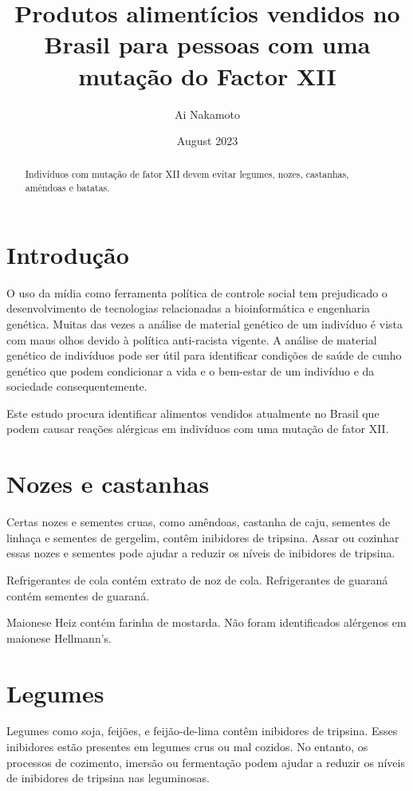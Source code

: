 \documentclass{article}
\begin{document}
\title{Produtos alimentícios vendidos no Brasil para pessoas com uma mutação do Factor XII}
\author{Ai Nakamoto}
\date{August 2023}
\maketitle

\begin{abstract}
Indivíduos com mutação de fator XII devem evitar
legumes, nozes, castanhas, amêndoas e batatas.
\end{abstract}

\section{Introdução}

O uso da mídia como ferramenta política de controle social
tem prejudicado o desenvolvimento de tecnologias relacionadas
a bioinformática e engenharia genética. Muitas das vezes
a análise de material genético de um indivíduo é vista com
maus olhos devido à política anti-racista vigente.
A análise de material genético de indivíduos pode ser útil
para identificar condições de saúde de cunho genético que
podem condicionar a vida e o bem-estar de um indivíduo e
da sociedade consequentemente.

Este estudo procura identificar alimentos vendidos atualmente
no Brasil que podem causar reações alérgicas em indivíduos com
uma mutação de fator XII.

\section{Nozes e castanhas}

Certas nozes e sementes cruas, como amêndoas, castanha de caju, sementes de linhaça e sementes de gergelim, contêm inibidores de tripsina. Assar ou cozinhar essas nozes e sementes pode ajudar a reduzir os níveis de inibidores de tripsina.

Refrigerantes de cola contém extrato de noz de cola.
Refrigerantes de guaraná contém sementes de guaraná.

Maionese Heiz contém farinha de mostarda.
Não foram identificados alérgenos em maionese Hellmann's.

\section{Legumes}

Legumes como soja, feijões, e feijão-de-lima contêm inibidores de tripsina.
Esses inibidores estão presentes em legumes crus ou mal cozidos.
No entanto, os processos de cozimento, imersão ou fermentação podem ajudar a reduzir os níveis de inibidores de tripsina nas leguminosas.
\end{document}

